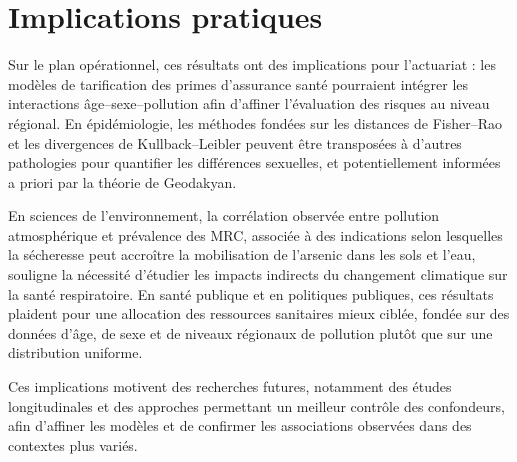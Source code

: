 \section{Implications pratiques}

Sur le plan opérationnel, ces résultats ont des implications pour l'actuariat : les modèles de tarification des primes d'assurance santé pourraient intégrer les interactions âge–sexe–pollution afin d'affiner l'évaluation des risques au niveau régional. En épidémiologie, les méthodes fondées sur les distances de Fisher–Rao et les divergences de Kullback–Leibler peuvent être transposées à d'autres pathologies pour quantifier les différences sexuelles, et potentiellement informées a priori par la théorie de Geodakyan.

En sciences de l'environnement, la corrélation observée entre pollution atmosphérique et prévalence des MRC, associée à des indications selon lesquelles la sécheresse peut accroître la mobilisation de l'arsenic dans les sols et l'eau, souligne la nécessité d'étudier les impacts indirects du changement climatique sur la santé respiratoire. En santé publique et en politiques publiques, ces résultats plaident pour une allocation des ressources sanitaires mieux ciblée, fondée sur des données d'âge, de sexe et de niveaux régionaux de pollution plutôt que sur une distribution uniforme.

Ces implications motivent des recherches futures, notamment des études longitudinales et des approches permettant un meilleur contrôle des confondeurs, afin d'affiner les modèles et de confirmer les associations observées dans des contextes plus variés.

